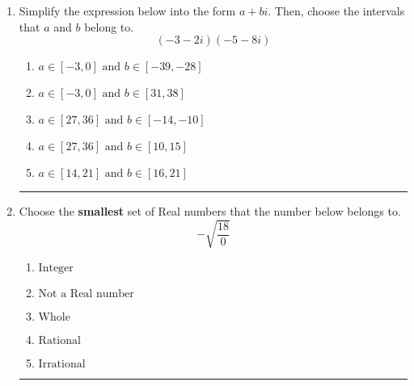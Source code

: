 \documentclass[14pt]{extbook}
\newcommand{\litem}[1]{\item#1\hspace*{-1cm}\rule{\textwidth}{0.4pt}}
\begin{document}
\begin{enumerate}
{\begin{enumerate}[label=\Alph*.]
\end{enumerate} }
\litem{
Simplify the expression below into the form $a+bi$. Then, choose the intervals that $a$ and $b$ belong to.\[ (-3 - 2 i)(-5 - 8 i) \]\begin{enumerate}[label=\Alph*.]
\item \( a \in [-3, 0] \text{ and } b \in [-39, -28] \)
\item \( a \in [-3, 0] \text{ and } b \in [31, 38] \)
\item \( a \in [27, 36] \text{ and } b \in [-14, -10] \)
\item \( a \in [27, 36] \text{ and } b \in [10, 15] \)
\item \( a \in [14, 21] \text{ and } b \in [16, 21] \)

\end{enumerate} }
\litem{
Choose the \textbf{smallest} set of Real numbers that the number below belongs to.\[ -\sqrt{\frac{18}{0}} \]\begin{enumerate}[label=\Alph*.]
\item \( \text{Integer} \)
\item \( \text{Not a Real number} \)
\item \( \text{Whole} \)
\item \( \text{Rational} \)
\item \( \text{Irrational} \)

\end{enumerate} }
\end{enumerate}
\end{document}
